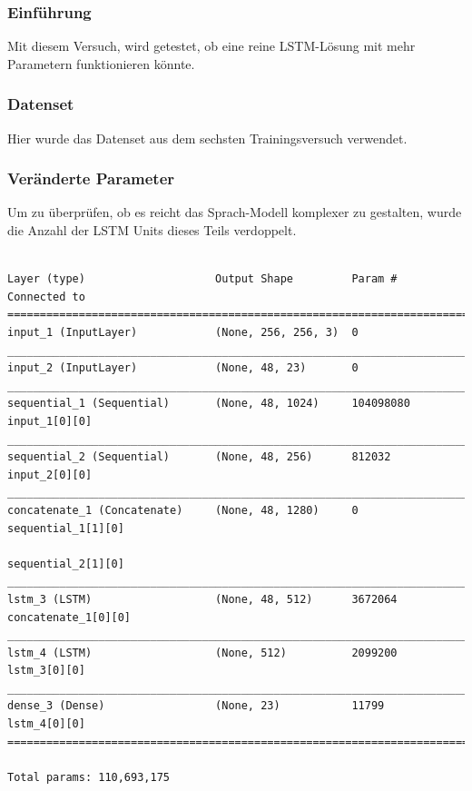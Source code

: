 \documentclass[pdftex,a4paper,halfparskip, article]{scrartcl}
\begin{document}
\subsubsection*{Einführung}

Mit diesem Versuch, wird getestet, ob eine reine LSTM-Lösung mit mehr Parametern funktionieren könnte. 

\subsubsection*{Datenset}

Hier wurde das Datenset aus dem sechsten Trainingsversuch verwendet.

\subsubsection*{Veränderte Parameter}

Um zu überprüfen, ob es reicht das Sprach-Modell komplexer zu gestalten, wurde die Anzahl der LSTM Units dieses Teils verdoppelt. 

\begin{verbatim}

Layer (type)                    Output Shape         Param #     Connected to
==============================================================================
input_1 (InputLayer)            (None, 256, 256, 3)  0
______________________________________________________________________________
input_2 (InputLayer)            (None, 48, 23)       0
______________________________________________________________________________
sequential_1 (Sequential)       (None, 48, 1024)     104098080   input_1[0][0]
______________________________________________________________________________
sequential_2 (Sequential)       (None, 48, 256)      812032      input_2[0][0]
______________________________________________________________________________
concatenate_1 (Concatenate)     (None, 48, 1280)     0           sequential_1[1][0]
                                                                 sequential_2[1][0]
______________________________________________________________________________
lstm_3 (LSTM)                   (None, 48, 512)      3672064     concatenate_1[0][0]
______________________________________________________________________________
lstm_4 (LSTM)                   (None, 512)          2099200     lstm_3[0][0]
______________________________________________________________________________
dense_3 (Dense)                 (None, 23)           11799       lstm_4[0][0]
==============================================================================

Total params: 110,693,175
\end{verbatim}
\end{document}
